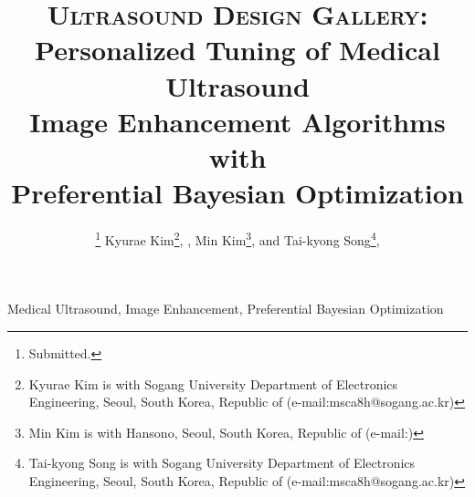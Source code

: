 \documentclass[journal,twoside,web]{ieeecolor}
\begin{document}
\title{\textsc{Ultrasound Design Gallery}: \\ Personalized Tuning of Medical Ultrasound \\ Image Enhancement Algorithms with \\ Preferential Bayesian Optimization }
\author{
  \thanks{Submitted.}
%
  Kyurae Kim\thanks{Kyurae Kim is with Sogang University Department of Electronics Engineering, Seoul, South Korea, Republic of (e-mail:msca8h@sogang.ac.kr)},
  , Min Kim\thanks{Min Kim is with Hansono, Seoul, South Korea, Republic of (e-mail:)},
  and Tai-kyong Song\thanks{Tai-kyong Song is with Sogang University Department of Electronics Engineering, Seoul, South Korea, Republic of (e-mail:msca8h@sogang.ac.kr)}, 
}%
%


\maketitle

\begin{abstract}
  
\end{abstract}

\begin{IEEEkeywords}
  Medical Ultrasound, Image Enhancement, Preferential Bayesian Optimization
\end{IEEEkeywords}










\end{document}
